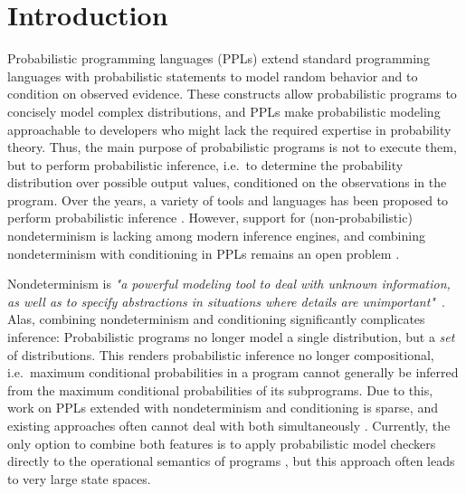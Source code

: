
\section{Introduction}


Probabilistic programming languages (PPLs) extend standard programming languages with probabilistic statements to model random behavior and to condition on observed evidence.
These constructs allow probabilistic programs to concisely model complex distributions, and PPLs make probabilistic modeling approachable to developers who might lack the required expertise in probability theory. 
Thus, the main purpose of probabilistic programs is not to execute them, but to perform probabilistic inference, i.e.\ to determine the probability distribution over possible output values, conditioned on the observations in the program.
Over the years, a variety of tools and languages has been proposed to perform probabilistic inference \cite{ gehr2016psi, wang2018pmaf, bingham2019pyro, wood-aistats-2014, randone2024inference}.
However, support for (non-probabilistic) nondeterminism is lacking among modern inference engines, and combining nondeterminism with conditioning in PPLs remains an open problem \cite{gordon2014probabilistic, junges2023scalable}.

Nondeterminism is \textit{"a powerful modeling tool to deal with unknown information, as well as to specify abstractions in situations where details are unimportant"}~\cite{gordon2014probabilistic}.
Alas, combining nondeterminism and conditioning significantly complicates inference:
Probabilistic programs no longer model a single distribution, but a \emph{set} of distributions. 
This renders probabilistic inference no longer compositional, i.e.\ maximum conditional probabilities in a program cannot generally be inferred from the maximum conditional probabilities of its subprograms.
Due to this, work on PPLs extended with nondeterminism and conditioning is sparse, and existing approaches often cannot deal with both simultaneously \cite{olmedo2018conditioning, van2010dtproblog}.
Currently, the only option to combine both features is to apply probabilistic model checkers directly to the operational semantics of programs \cite{jansen2016bounded}, but this approach often leads to very large state spaces.


